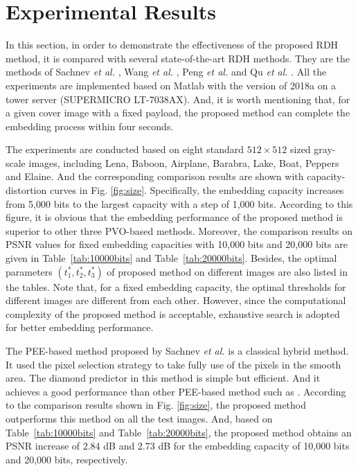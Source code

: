 \documentclass[review,3p,10pt,sort&compress]{elsarticle}
\begin{document}
\section{Experimental Results}\label{sec:4}
In this section, in order to demonstrate the effectiveness of the proposed RDH method, it is compared with several state-of-the-art RDH methods. They are the methods of Sachnev \emph{et al.} \cite{Sachnev2009Reversible}, Wang \emph{et al.} \cite{Wang2017Rate}, Peng \emph{et al.} \cite{Peng2014IPVO} and Qu \emph{et al.} \cite{Qu2015PPVO}. All the experiments are implemented based on Matlab with the version of 2018a on a tower server (SUPERMICRO LT-7038AX). And, it is worth mentioning that, for a given cover image with a fixed payload, the proposed method can complete the embedding process within four seconds.

The experiments are conducted based on eight standard $512 \times 512$ sized gray-scale images, including Lena, Baboon, Airplane, Barabra, Lake, Boat, Peppers and Elaine. And the corresponding comparison results are shown with capacity-distortion curves in Fig. \ref{fig:size}. Specifically, the embedding capacity increases from 5,000 bits to the largest capacity with a step of 1,000 bits. According to this figure, it is obvious that the embedding performance of the proposed method is superior to other three PVO-based methods. Moreover, the comparison results on PSNR values for fixed embedding capacities with 10,000 bits and 20,000 bits are given in Table~\ref{tab:10000bits} and Table~\ref{tab:20000bits}. Besides, the optimal parameters $(t_1^*, t_2^*, t_3^*)$ of proposed method on different images are also listed in the tables. Note that, for a fixed embedding capacity, the optimal thresholds for different images are different from each other. However, since the computational complexity of the proposed method is acceptable, exhaustive search is adopted for better embedding performance.

The PEE-based method proposed by Sachnev \emph{et al.} is a classical hybrid method. It used the pixel selection strategy to take fully use of the pixels in the smooth area. The diamond predictor in this method is simple but efficient. And it achieves a good performance than other PEE-based method such as \cite{Luo}. According to the comparison results shown in Fig. \ref{fig:size}, the proposed method outperforms this method on all the test images. And, based on Table~\ref{tab:10000bits} and Table~\ref{tab:20000bits}, the proposed method obtains an PSNR increase of 2.84 dB and 2.73 dB for the embedding capacity of 10,000 bits and 20,000 bits, respectively.
\end{document}
